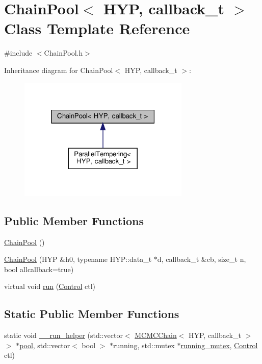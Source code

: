 \hypertarget{class_chain_pool}{}\section{Chain\+Pool$<$ H\+YP, callback\+\_\+t $>$ Class Template Reference}
\label{class_chain_pool}


{\ttfamily \#include $<$Chain\+Pool.\+h$>$}



Inheritance diagram for Chain\+Pool$<$ H\+YP, callback\+\_\+t $>$\+:
\nopagebreak
\begin{figure}[H]
\begin{center}
\leavevmode
\includegraphics[width=231pt]{class_chain_pool__inherit__graph}
\end{center}
\end{figure}
\subsection*{Public Member Functions}
\begin{DoxyCompactItemize}
\item 
\hyperlink{class_chain_pool_ae8795a9a7c0fff45c82334fa821c8c3c}{Chain\+Pool} ()
\item 
\hyperlink{class_chain_pool_a7794efde5588ecbf3603170d6226cd6f}{Chain\+Pool} (H\+YP \&h0, typename H\+Y\+P\+::data\+\_\+t $\ast$d, callback\+\_\+t \&cb, size\+\_\+t n, bool allcallback=true)
\item 
virtual void \hyperlink{class_chain_pool_af5f0e391f9794ff89f29296c8b41bf8e}{run} (\hyperlink{struct_control}{Control} ctl)
\end{DoxyCompactItemize}
\subsection*{Static Public Member Functions}
\begin{DoxyCompactItemize}
\item 
static void \hyperlink{class_chain_pool_a7df513bcd7b99c2fa99a9cfdd238817b}{\+\_\+\+\_\+run\+\_\+helper} (std\+::vector$<$ \hyperlink{class_m_c_m_c_chain}{M\+C\+M\+C\+Chain}$<$ H\+YP, callback\+\_\+t $>$$>$ $\ast$\hyperlink{class_chain_pool_af89400f6e9a2312fe2ee7873745a6e91}{pool}, std\+::vector$<$ bool $>$ $\ast$running, std\+::mutex $\ast$\hyperlink{class_chain_pool_a6efe006156a22132b452d50dab9f76c0}{running\+\_\+mutex}, \hyperlink{struct_control}{Control} ctl)
\end{DoxyCompactItemize}
